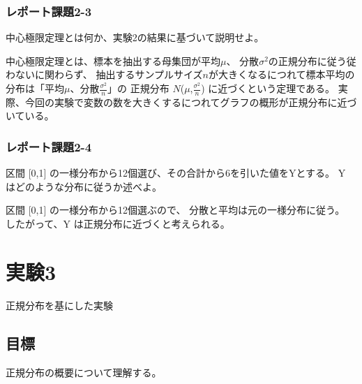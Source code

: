 \documentclass[12pt]{jarticle}
\begin{document}
\subsubsection*{レポート課題2-3}
\begin{shadebox}
    中心極限定理とは何か、実験2の結果に基づいて説明せよ。
\end{shadebox}
中心極限定理とは、標本を抽出する母集団が平均$\mu$、
分散$ \sigma^2$の正規分布に従う従わないに関わらず、
抽出するサンプルサイズ$n$が大きくなるにつれて標本平均の分布は「平均$\mu$、分散$\frac{\sigma^2}{n}$」の
正規分布 $N$($\mu$,$\frac{\sigma^2}{n}$) に近づくという定理である。
実際、今回の実験で変数の数を大きくするにつれてグラフの概形が正規分布に近づいている。

\subsubsection*{レポート課題2-4}
\begin{shadebox}
    区間 [0,1] の一様分布から12個選び、その合計から6を引いた値をYとする。
    Y はどのような分布に従うか述べよ。
\end{shadebox}
区間 [0,1] の一様分布から12個選ぶので、
分散と平均は元の一様分布に従う。
したがって、Y は正規分布に近づくと考えられる。

\clearpage

\section{実験3}
正規分布を基にした実験

\subsection{目標}
正規分布の概要について理解する。
\end{document}
